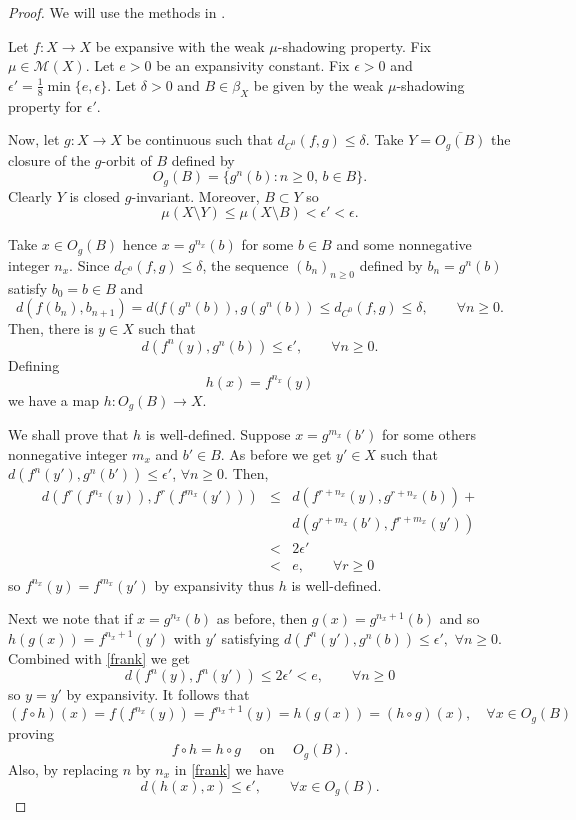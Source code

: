 \documentclass[11pt,letterpaper]{amsart}
\theoremstyle{plain}
\begin{document}
\begin{proof}
We will use the methods in \cite{klm}.

Let $f:X\to X$ be expansive with the weak $\mu$-shadowing property.
Fix $\mu\in\mathcal{M}(X)$.
Let $e>0$ be an expansivity constant.
Fix $\epsilon>0$ and $\epsilon'=\frac{1}8\min\{e,\epsilon\}$.
Let $\delta>0$ and $B\in \beta_X$ be given by the weak $\mu$-shadowing property for $\epsilon'$. 

Now, let $g:X\to X$ be continuous such that $d_{C^0}(f,g)\leq \delta$.
Take $Y=\overline{O_g(B)}$ the closure of the $g$-orbit of $B$ defined by
$$
O_g(B)=\{g^n(b):n\geq0,\,b\in B\}.
$$
Clearly $Y$ is closed $g$-invariant. Moreover,  $B\subset Y$ so
\begin{equation}
\label{chikatilo}
\mu(X\setminus Y)\leq \mu(X\setminus B)<\epsilon'<\epsilon.
\end{equation}

Take $x\in O_g(B)$ hence $x=g^{n_x}(b)$ for some $b\in B$ and some nonnegative integer $n_x$.
Since $d_{C^0}(f,g)\leq\delta$, the sequence $(b_n)_{n\geq0}$ defined by
$b_n=g^n(b)$ satisfy
$b_0=b\in B$ and
$$
d(f(b_n),b_{n+1})
=  d(f(g^n(b)),g(g^n(b)) \leq d_{C^0}(f,g)\leq\delta,\quad\quad\forall
n\geq0.
$$
Then, there is $y\in X$ such that
\begin{equation}
\label{frank}
d(f^n(y),g^n(b))\leq\epsilon',\quad\quad\forall n\geq0.
\end{equation}
Defining
$$
h(x)=f^{n_x}(y)
$$
we have a map $h:O_g(B)\to X$.

We shall prove that $h$ is well-defined.
Suppose $x=g^{m_x}(b')$ for some others nonnegative integer $m_x$ and $b'\in B$.
As before we get $y'\in X$ such that
$
d(f^n(y'),g^n(b'))\leq\epsilon'
$, $\forall n\geq0.$
Then,
\begin{eqnarray*}
d(f^r(f^{n_x}(y)),f^r(f^{m_x}(y'))) & \leq &
d(f^{r+n_x}(y),g^{r+n_x}(b))+\\
& & d(g^{r+m_x}(b'),f^{r+m_x}(y'))\\
& < & 2\epsilon'\\
& < & e,\quad\quad\forall r\geq0
\end{eqnarray*}
so $f^{n_x}(y)=f^{m_x}(y')$ by expansivity thus $h$ is well-defined.

Next we note that
if $x=g^{n_x}(b)$ as before, then $g(x)=g^{n_x+1}(b)$ and so
$h(g(x))=f^{n_x+1}(y')$ with $y'$ satisfying
$
d(f^n(y'),g^n(b))\leq \epsilon',
$ $\forall n\geq0.$
Combined with \eqref{frank} we get
$$
d(f^n(y),f^n(y'))\leq 2\epsilon'<e,\quad\quad\forall n\geq0
$$ so $y=y'$ by expansivity.
It follows that
$$
(f\circ h)(x)=f(f^{n_x}(y))=f^{n_x+1}(y)=h(g(x))=(h\circ g)(x),\quad\forall x\in O_g(B)
$$
proving
\begin{equation}
\label{wood}
f\circ h=h\circ g\quad\mbox{ on }\quad O_g(B).
\end{equation}
Also, by replacing $n$ by $n_x$ in \eqref{frank} we have
\begin{equation}
\label{under}
d(h(x),x)\leq \epsilon',\quad\quad\forall x\in O_g(B).
\end{equation}



\end{proof}
\end{document}
